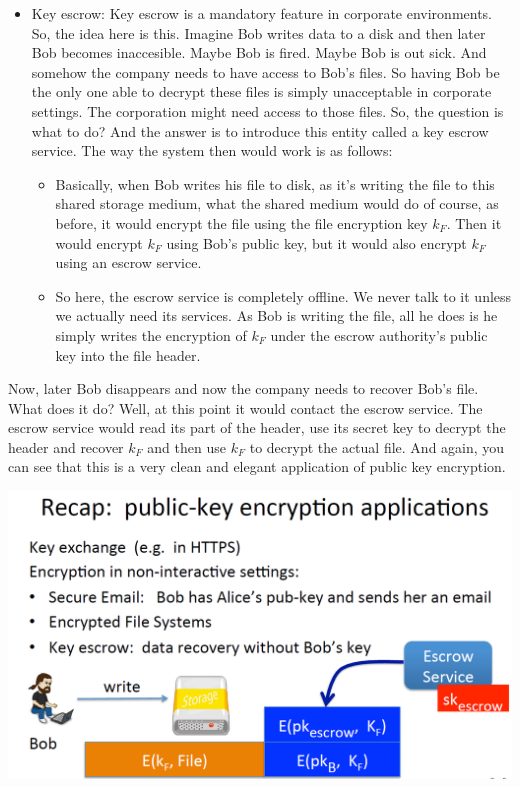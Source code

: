 \documentclass[11pt]{article}
\makeatletter
\def\maxwidth{\ifdim\Gin@nat@width>\linewidth\linewidth
    \else\Gin@nat@width\fi}
\let\Oldincludegraphics\includegraphics
\renewcommand{\includegraphics}[1]{\Oldincludegraphics[width=.8\maxwidth]{#1}}
\providecommand{\tightlist}{%
      \setlength{\itemsep}{0pt}\setlength{\parskip}{0pt}}
\makeatother
\begin{document}
\begin{itemize}
  \begin{itemize}
  \tightlist
  \item
    Key escrow: Key escrow is a mandatory feature in corporate
    environments. So, the idea here is this. Imagine Bob writes data to
    a disk and then later Bob becomes inaccesible. Maybe Bob is fired.
    Maybe Bob is out sick. And somehow the company needs to have access
    to Bob's files. So having Bob be the only one able to decrypt these
    files is simply unacceptable in corporate settings. The corporation
    might need access to those files. So, the question is what to do?
    And the answer is to introduce this entity called a key escrow
    service. The way the system then would work is as follows:

    \begin{itemize}
    \tightlist
    \item
      Basically, when Bob writes his file to disk, as it's writing the
      file to this shared storage medium, what the shared medium would
      do of course, as before, it would encrypt the file using the file
      encryption key \(k_{F}\). Then it would encrypt \(k_{F}\) using
      Bob's public key, but it would also encrypt \(k_{F}\) using an
      escrow service. 
    \item
      So here, the escrow service is completely offline. We never talk
      to it unless we actually need its services. As Bob is writing the
      file, all he does is he simply writes the encryption of \(k_{F}\)
      under the escrow authority's public key into the file header. 
    \end{itemize}
  \end{itemize}

  Now, later Bob disappears and now the company needs to recover Bob's
  file. What does it do? Well, at this point it would contact the escrow
  service. The escrow service would read its part of the header, use its
  secret key to decrypt the header and recover \(k_{F}\) and then use
  \(k_{F}\) to decrypt the actual file. And again, you can see that this
  is a very clean and elegant application of public key encryption.
\end{itemize}

\includegraphics{./Images/PKEncApp2-Recap.png}
\end{document}
